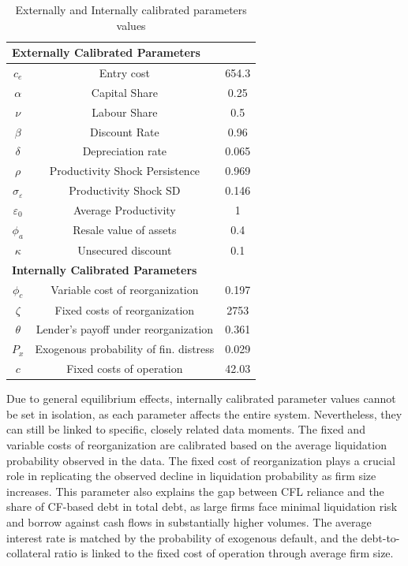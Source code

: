 \documentclass[12pt]{article}
\begin{document}
\begin{table}[h!]
    \centering
    \begin{tabular}{c|c|c}
    \multicolumn{3}{l}{\textbf{Externally Calibrated Parameters}} \\ 
    \midrule
    $c_e$ & Entry cost & 654.3 \\
    $\alpha$ & Capital Share & 0.25 \\
    $\nu$ & Labour Share & 0.5 \\
    $\beta$ & Discount Rate & 0.96 \\
    $\delta$ & Depreciation rate & 0.065 \\
    $\rho$ & Productivity Shock Persistence & 0.969 \\
    $\sigma_{\varepsilon}$ & Productivity Shock SD & 0.146 \\
    $\varepsilon_0$ & Average Productivity & 1 \\
    $\phi_a$ & Resale value of assets & 0.4 \\
    $\kappa$ & Unsecured discount & 0.1 \vspace{3mm} \\
    \multicolumn{3}{l}{\textbf{Internally Calibrated Parameters}} \\ 
    \midrule
    $\phi_c$ & Variable cost of reorganization & 0.197 \\
    $\zeta$ & Fixed costs of reorganization & 2753 \\
    $ \theta $ & Lender's payoff under reorganization  & 0.361 \\
    $P_x$ & Exogenous probability of fin. distress & 0.029 \\
    $ c $ & Fixed costs of operation & 42.03 \\
    \bottomrule
    \end{tabular}
    \caption{Externally and Internally calibrated parameters values}
    \label{tab:external calib}
\end{table}

Due to general equilibrium effects, internally calibrated parameter values cannot be set in isolation, as each parameter affects the entire system. Nevertheless, they can still be linked to specific, closely related data moments. The fixed and variable costs of reorganization are calibrated based on the average liquidation probability observed in the data. The fixed cost of reorganization plays a crucial role in replicating the observed decline in liquidation probability as firm size increases. This parameter also explains the gap between CFL reliance and the share of CF-based debt in total debt, as large firms face minimal liquidation risk and borrow against cash flows in substantially higher volumes. The average interest rate is matched by the probability of exogenous default, and the debt-to-collateral ratio is linked to the fixed cost of operation through average firm size.
\end{document}

